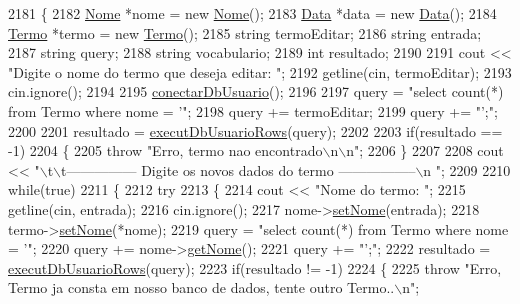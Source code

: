 \begin{DoxyCode}
2181   \{
2182     \mbox{\hyperlink{class_nome}{Nome}} *nome = \textcolor{keyword}{new} \mbox{\hyperlink{class_nome}{Nome}}();
2183     \mbox{\hyperlink{class_data}{Data}} *data = \textcolor{keyword}{new} \mbox{\hyperlink{class_data}{Data}}();
2184     \mbox{\hyperlink{class_termo}{Termo}} *termo = \textcolor{keyword}{new} \mbox{\hyperlink{class_termo}{Termo}}();
2185     \textcolor{keywordtype}{string} termoEditar;
2186     \textcolor{keywordtype}{string} entrada;
2187     \textcolor{keywordtype}{string} query;
2188     \textcolor{keywordtype}{string} vocabulario;
2189     \textcolor{keywordtype}{int} resultado;
2190 
2191     cout << \textcolor{stringliteral}{"Digite o nome do termo que deseja editar: "};
2192     getline(cin, termoEditar);
2193     cin.ignore();
2194 
2195     \mbox{\hyperlink{comando_sql_8cpp_a4f89ddcbc4cf8f2587d89f72f8c7900d}{conectarDbUsuario}}();
2196 
2197     query = \textcolor{stringliteral}{"select count(*) from Termo where nome = '"};
2198     query += termoEditar;
2199     query += \textcolor{stringliteral}{"';"};
2200 
2201     resultado = \mbox{\hyperlink{comando_sql_8cpp_af54952694f2fa7d76f969fb74b853cb9}{executDbUsuarioRows}}(query);
2202 
2203     \textcolor{keywordflow}{if}(resultado == -1)
2204     \{
2205       \textcolor{keywordflow}{throw} \textcolor{stringliteral}{"Erro, termo nao encontrado\(\backslash\)n\(\backslash\)n"};
2206     \}
2207 
2208     cout << \textcolor{stringliteral}{"\(\backslash\)t\(\backslash\)t--------------- Digite os novos dados do termo -----------------\(\backslash\)n "};
2209 
2210     \textcolor{keywordflow}{while}(\textcolor{keyword}{true})
2211     \{
2212       \textcolor{keywordflow}{try}
2213       \{
2214         cout << \textcolor{stringliteral}{"Nome do termo: "};
2215         getline(cin, entrada);
2216         cin.ignore();
2217         nome->\mbox{\hyperlink{class_nome_a83b9f56ec9f86f4b976846f4c5c65b30}{setNome}}(entrada);
2218         termo->\mbox{\hyperlink{class_termo_a43246196cccd6fa074731e93ac15f07a}{setNome}}(*nome);
2219         query = \textcolor{stringliteral}{"select count(*) from Termo where nome = '"};
2220         query += nome->\mbox{\hyperlink{class_nome_aad41176173eec20cbbae1576447a3697}{getNome}}();
2221         query += \textcolor{stringliteral}{"';"};
2222         resultado = \mbox{\hyperlink{comando_sql_8cpp_af54952694f2fa7d76f969fb74b853cb9}{executDbUsuarioRows}}(query);
2223         \textcolor{keywordflow}{if}(resultado != -1)
2224         \{
2225           \textcolor{keywordflow}{throw} \textcolor{stringliteral}{"Erro, Termo ja consta em nosso banco de dados, tente outro Termo..\(\backslash\)n"};

\end{DoxyCode}
